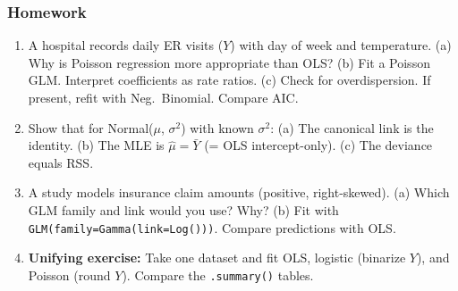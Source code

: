 \documentclass[aspectratio=169]{beamer}
\begin{document}
\begin{frame}
\frametitle{Homework}
\begin{enumerate}\setlength{\itemsep}{3pt}
  \item A hospital records daily ER visits ($Y$) with day of week and temperature.
    (a) Why is Poisson regression more appropriate than OLS?
    (b) Fit a Poisson GLM. Interpret coefficients as rate ratios.
    (c) Check for overdispersion. If present, refit with Neg.\ Binomial. Compare AIC.

  \item Show that for Normal($\mu$, $\sigma^2$) with known $\sigma^2$:
    (a) The canonical link is the identity.
    (b) The MLE is $\hat\mu = \bar{Y}$ (= OLS intercept-only).
    (c) The deviance equals RSS.

  \item A study models insurance claim amounts (positive, right-skewed).
    (a) Which GLM family and link would you use? Why?
    (b) Fit with \texttt{GLM(family=Gamma(link=Log()))}. Compare predictions with OLS.

  \item \textbf{Unifying exercise:} Take one dataset and fit OLS, logistic (binarize $Y$), and Poisson (round $Y$). Compare the \texttt{.summary()} tables.
\end{enumerate}
\end{frame}
\end{document}
